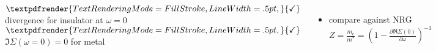 \documentclass[20pt, a1paper, portrait]{tikzposter}
\newcommand*{\boldcheckmark}{%
  \textpdfrender{
    TextRenderingMode=FillStroke,
    LineWidth=.5pt, %
  }{\checkmark}%
}
\begin{document}
\begin{columns}
    {
        \begin{center}
            \hspace{2cm}
            \textcolor{green}{$\boldcheckmark$} divergence for insulator at $\omega=0$
            \hspace{2cm}
            \textcolor{green}{$\boldcheckmark$} $\Im\Sigma(\omega=0)=0$ for metal
            \vspace{0.5cm}
        \end{center}
    }

    {
        \begin{itemize}
            \item compare against NRG
                  \hspace{9cm}
                  $Z = \frac{m_\mathrm{e}}{m^*} = \left(1 - \frac{\partial\Re\Sigma(0)}{\partial\omega}\right)^{-1}$
        \end{itemize}
        \vspace{0.5cm}
        \centering
        
    }

\end{columns}
\end{document}
